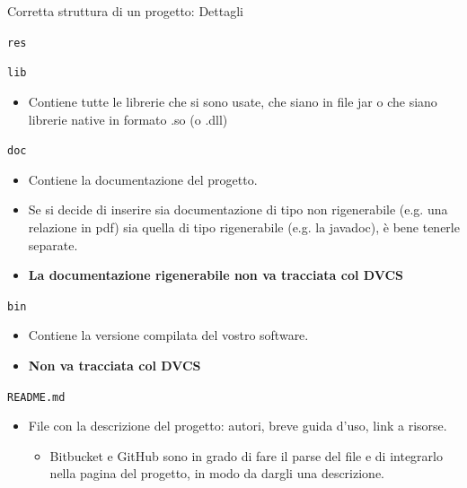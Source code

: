 \documentclass[presentation]{beamer}
\begin{document}
\begin{frame}[allowframebreaks]{Corretta struttura di un progetto: Dettagli}
\begin{block}{\texttt{res}}
\begin{itemize}
		\end{itemize}
	\end{block}
	\begin{block}{\texttt{lib}}
		\begin{itemize}
			\item	Contiene tutte le librerie che si sono usate, che siano in file jar o che siano librerie native in formato .so (o .dll)
		\end{itemize}
	\end{block}
	\begin{block}{\texttt{doc}}
		\begin{itemize}
			\item Contiene la documentazione del progetto.
			\item Se si decide di inserire sia documentazione di tipo non rigenerabile (e.g. una relazione in pdf) sia quella di tipo rigenerabile (e.g. la javadoc), è bene tenerle separate.
			\item \textbf{La documentazione rigenerabile non va tracciata col DVCS}
		\end{itemize}
	\end{block}
	\begin{block}{\texttt{bin}}
		\begin{itemize}
			\item Contiene la versione compilata del vostro software.
			\item \textbf{Non va tracciata col DVCS}
		\end{itemize}
	\end{block}
	\begin{block}{\texttt{README.md}}
		\begin{itemize}
			\item File con la descrizione del progetto: autori, breve guida d'uso, link a risorse.
			\begin{itemize}
				\item Bitbucket e GitHub sono in grado di fare il parse del file e di integrarlo nella pagina del progetto, in modo da dargli una descrizione.
			\end{itemize} 
		\end{itemize} 
	\end{block}
\end{frame}
\end{document}
